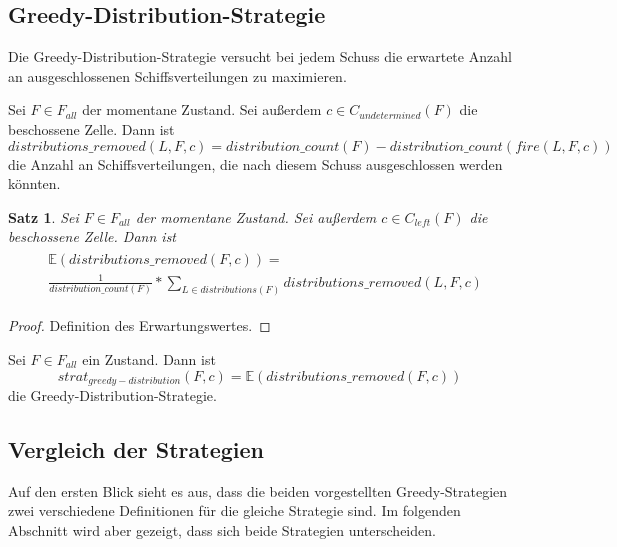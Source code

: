 \documentclass[a4paper,12pt]{llncs}
\numberwithin{equation}{section}
\newtheorem{satz}{Satz}
\begin{document}
\subsection{Greedy-Distribution-Strategie}
Die Greedy-Distribution-Strategie versucht bei jedem Schuss die erwartete Anzahl an ausgeschlossenen Schiffsverteilungen zu maximieren.

\begin{definition}
Sei $F\in F_{all}$ der momentane Zustand.
Sei außerdem $c \in C_{undetermined}(F)$ die beschossene Zelle.
Dann ist
\[
distributions\_removed(L, F, c)=distribution\_count(F) - distribution\_count(fire(L, F,c))
\]
die Anzahl an Schiffsverteilungen, die nach diesem Schuss ausgeschlossen werden könnten.
\end{definition}

\begin{satz}
Sei $F\in F_{all}$ der momentane Zustand.
Sei außerdem $c \in C_{left}(F)$ die beschossene Zelle.
Dann ist
\begin{align}
\begin{split}
&\mathds{E}(distributions\_removed(F,c))=\\
&\frac{1}{distribution\_count(F)} * \sum_{L \in distributions(F)} distributions\_removed(L, F, c) \nonumber
\end{split}
\end{align}
\end{satz}

\begin{proof}
Definition des Erwartungswertes.
\end{proof}

\begin{definition}
Sei $F\in F_{all}$ ein Zustand.
Dann ist
\[
strat_{greedy-distribution}(F,c)=\mathds{E}(distributions\_removed(F,c))
\]
die Greedy-Distribution-Strategie.
\end{definition}

\subsection{Vergleich der Strategien}
Auf den ersten Blick sieht es aus, dass die beiden vorgestellten Greedy-Strategien zwei verschiedene Definitionen für die gleiche Strategie sind. Im folgenden Abschnitt wird aber gezeigt, dass sich beide Strategien unterscheiden.
\end{document}

